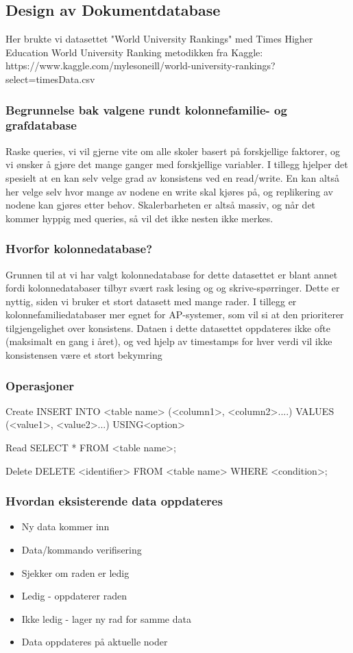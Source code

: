 \subsection{Design av Dokumentdatabase}
Her brukte vi datasettet "World University Rankings" med Times Higher Education World University Ranking metodikken fra Kaggle: https://www.kaggle.com/mylesoneill/world-university-rankings?select=timesData.csv

\subsubsection{Begrunnelse bak valgene rundt kolonnefamilie- og grafdatabase}
Raske queries, vi vil gjerne vite om alle skoler basert på forskjellige faktorer, og vi ønsker å gjøre det 
mange ganger med forskjellige variabler. I tillegg hjelper det spesielt at en kan selv velge grad av 
konsistens ved en read/write. En kan altså her velge selv hvor mange av nodene en write skal kjøres 
på, og replikering av nodene kan gjøres etter behov. Skalerbarheten er altså massiv, og når det 
kommer hyppig med queries, så vil det ikke nesten ikke merkes.

\subsubsection{Hvorfor kolonnedatabase?}
Grunnen til at vi har valgt kolonnedatabase for dette datasettet er blant annet fordi 
kolonnedatabaser tilbyr svært rask lesing og og skrive-spørringer. Dette er nyttig, siden vi bruker et 
stort datasett med mange rader. I tillegg er kolonnefamiliedatabaser mer egnet for AP-systemer, 
som vil si at den prioriterer tilgjengelighet over konsistens. Dataen i dette datasettet oppdateres ikke 
ofte (maksimalt en gang i året), og ved hjelp av timestamps for hver verdi vil ikke konsistensen være 
et stort bekymring

\subsubsection{Operasjoner}
Create
INSERT INTO <table name>
(<column1>, <column2>....)
VALUES (<value1>, <value2>...)
USING<option>

Read
SELECT * FROM <table name>;

Delete
DELETE <identifier> FROM <table name> WHERE <condition>;

\subsubsection{Hvordan eksisterende data oppdateres}
\begin{itemize}
  \item Ny data kommer inn
  \item Data/kommando verifisering
  \item Sjekker om raden er ledig
  \item Ledig - oppdaterer raden
  \item Ikke ledig - lager ny rad for samme data
  \item Data oppdateres på aktuelle noder
\end{itemize}

